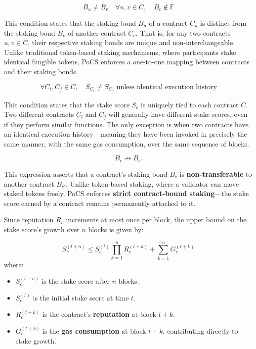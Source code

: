 \documentclass{article}
\begin{document}
\begin{equation}
B_u \neq B_v \quad \forall u,v \in C, \quad B_c \notin \mathbb{F}
\end{equation}

This condition states that the staking bond $B_u$ of a contract $C_u$ is distinct from the staking bond $B_v$ of another contract $C_v$. That is, for any two contracts $u, v \in C$, their respective staking bonds are unique and non-interchangeable. Unlike traditional token-based staking mechanisms, where participants stake identical fungible tokens, PoCS enforces a one-to-one mapping between contracts and their staking bonds.

\begin{equation}
\forall C_i, C_j \in C, \quad S_{C_i} \neq S_{C_j} \text{ unless identical execution history}
\end{equation}

This condition states that the stake score \( S_c \) is uniquely tied to each contract \( C \). Two different contracts \( C_i \) and \( C_j \) will generally have different stake scores, even if they perform similar functions. The only exception is when two contracts have an identical execution history—meaning they have been invoked in precisely the same manner, with the same gas consumption, over the same sequence of blocks. 

\begin{equation}
B_c \not\rightarrow B_{c'}
\end{equation}

This expression asserts that a contract’s staking bond \( B_c \) is \textbf{non-transferable} to another contract \( B_{c'} \). Unlike token-based staking, where a validator can move staked tokens freely, PoCS enforces \textbf{strict contract-bound staking}—the stake score earned by a contract remains permanently attached to it.

Since reputation \( R_c \) increments at most once per block, the upper bound on the stake score’s growth over \( n \) blocks is given by:

\begin{equation}
S_c^{(t+n)} \leq S_c^{(t)} \prod_{k=1}^{n} R_c^{(t+k)} + \sum_{k=1}^{n} G_c^{(t+k)}
\end{equation} 
where:
\begin{itemize}
    \item \( S_c^{(t+n)} \) is the stake score after \( n \) blocks.
    \item \( S_c^{(t)} \) is the initial stake score at time \( t \).
    \item \( R_c^{(t+k)} \) is the contract's \textbf{reputation} at block \( t+k \).
    \item \( G_c^{(t+k)} \) is the \textbf{gas consumption} at block \( t+k \), contributing directly to stake growth.
\end{itemize}
        
\end{document}
